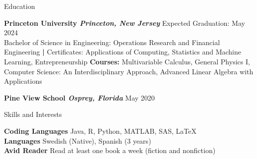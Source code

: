 \documentclass{resume} %
\begin{document}





\begin{rSection}{Education}

{\bf Princeton University \normalfont\em Princeton, New Jersey} \hfill Expected Graduation: May 2024
\\ 
Bachelor of Science in Engineering: Operations Research and Financial Engineering \textbf{|} Certificates: Applications of Computing, Statistics and Machine Learning, Entrepreneurship %
\newline \textbf{Courses:} Multivariable Calculus, General Physics I, Computer Science: An Interdisciplinary Approach, Advanced Linear Algebra with Applications

{\bf Pine View School \normalfont\em Osprey, Florida} \hfill May 2020

\end{rSection}



\begin{rSection}{Skills and Interests}

\textbf{Coding Languages} Java, R, Python, MATLAB, SAS, \LaTeX 
\\
\textbf{Languages} Swedish (Native), Spanish (3 years)
\\
\textbf{Avid Reader} Read at least one book a week (fiction and nonfiction)
\end{rSection}
\end{document}
